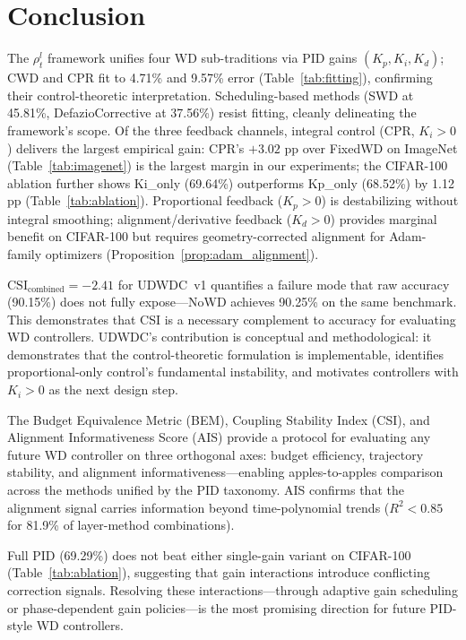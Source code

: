 \documentclass{article}
\begin{document}
\section{Conclusion}
\label{sec:conclusion}

The $\rho_t^l$ framework unifies four WD sub-traditions via PID gains $(K_p, K_i, K_d)$; CWD and CPR fit to 4.71\% and 9.57\% error (Table~\ref{tab:fitting}), confirming their control-theoretic interpretation. Scheduling-based methods (SWD at 45.81\%, DefazioCorrective at 37.56\%) resist fitting, cleanly delineating the framework's scope. Of the three feedback channels, integral control (CPR, $K_i > 0$) delivers the largest empirical gain: CPR's $+3.02$ pp over FixedWD on ImageNet (Table~\ref{tab:imagenet}) is the largest margin in our experiments; the CIFAR-100 ablation further shows Ki\_only (69.64\%) outperforms Kp\_only (68.52\%) by 1.12 pp (Table~\ref{tab:ablation}). Proportional feedback ($K_p > 0$) is destabilizing without integral smoothing; alignment/derivative feedback ($K_d > 0$) provides marginal benefit on CIFAR-100 but requires geometry-corrected alignment for Adam-family optimizers (Proposition~\ref{prop:adam_alignment}).

$\text{CSI}_{\text{combined}} = -2.41$ for UDWDC~v1 quantifies a failure mode that raw accuracy (90.15\%) does not fully expose---NoWD achieves 90.25\% on the same benchmark. This demonstrates that CSI is a necessary complement to accuracy for evaluating WD controllers. UDWDC's contribution is conceptual and methodological: it demonstrates that the control-theoretic formulation is implementable, identifies proportional-only control's fundamental instability, and motivates controllers with $K_i > 0$ as the next design step.

The Budget Equivalence Metric (BEM), Coupling Stability Index (CSI), and Alignment Informativeness Score (AIS) provide a protocol for evaluating any future WD controller on three orthogonal axes: budget efficiency, trajectory stability, and alignment informativeness---enabling apples-to-apples comparison across the methods unified by the PID taxonomy. AIS confirms that the alignment signal carries information beyond time-polynomial trends ($R^2 < 0.85$ for 81.9\% of layer-method combinations).

Full PID (69.29\%) does not beat either single-gain variant on CIFAR-100 (Table~\ref{tab:ablation}), suggesting that gain interactions introduce conflicting correction signals. Resolving these interactions---through adaptive gain scheduling or phase-dependent gain policies---is the most promising direction for future PID-style WD controllers.
\end{document}
